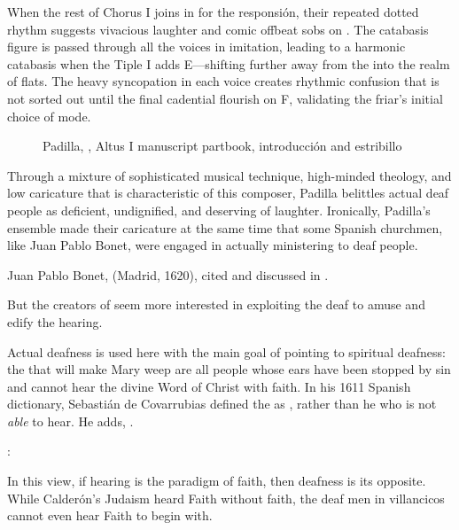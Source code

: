 When the rest of Chorus I joins in for the responsión, their repeated dotted 
rhythm suggests vivacious laughter and comic offbeat sobs on .
The catabasis figure is passed through all the voices in imitation, leading to 
a harmonic catabasis when the Tiple I adds E\fl{}---shifting further away from 
the  into the  realm of flats.
The heavy syncopation in each voice creates rhythmic confusion that is not 
sorted out until the final cadential flourish on F, validating the friar's 
initial choice of mode.

\begin{figure}
    \caption{Padilla, , Altus I manuscript 
    partbook, introducción and estribillo}
    \label{figure:Padilla-Sordo-MS-estribillo}
\end{figure}

Through a mixture of sophisticated musical technique, high-minded theology, and 
low caricature that is characteristic of this composer, Padilla belittles 
actual deaf people as deficient, undignified, and deserving of laughter.
Ironically, Padilla's ensemble made their caricature at the same time that some 
Spanish churchmen, like Juan Pablo Bonet, were engaged in actually ministering 
to deaf people.%
\begin{Footnote}
    Juan Pablo Bonet,  (Madrid, 1620), cited and discussed in 
    \autocite{Plann:DeafEducationSpain}.
\end{Footnote}
But the creators of  seem more interested in 
exploiting the deaf to amuse and edify the hearing.

Actual deafness is used here with the main goal of pointing to spiritual 
deafness: the  that will make Mary weep are all people whose 
ears have been stopped by sin and cannot hear the divine Word of Christ with 
faith.
In his 1611 Spanish dictionary, Sebastián de Covarrubias defined the 
 as , rather than he who is not 
\emph{able} to hear.
He adds, .%
\begin{Footnote}
    \Autocite[]{Covarrubias:Tesoro}:
\end{Footnote}
In this view, if hearing is the paradigm of faith, then deafness is its 
opposite.
While Calderón's Judaism heard Faith without faith, the deaf men in villancicos 
cannot even hear Faith to begin with.

